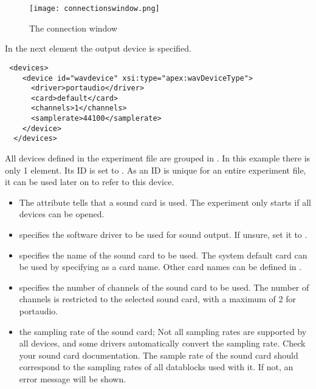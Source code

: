 \begin{figure}
 \centering
\texttt{[image: connectionswindow.png]}
 \caption{The connection window}
 \label{fig:ex1-output}
\end{figure}

In the next element the output device is specified.

\begin{lstlisting}
 <devices>
    <device id="wavdevice" xsi:type="apex:wavDeviceType">
      <driver>portaudio</driver>
      <card>default</card>
      <channels>1</channels>
      <samplerate>44100</samplerate>
    </device>
  </devices>

\end{lstlisting}

All devices defined in the experiment file are grouped in
. In this example there is only 1
 element. Its ID is set to . As an
ID is unique for an entire experiment file, it can be used later
on to refer to this device.

\begin{itemize}
\item  The  attribute tells
\apex that a sound card is used. The experiment only starts if all
devices can be opened.

\item {} specifies the software driver to be used
for sound output. If unsure, set it to .

\item {} specifies the name of the sound card to be
used. The system default card can be used by specifying
 as a card name. Other card names can be defined in
.

\item {} specifies the number of channels of the
sound card to be used. The number of channels is restricted to the
selected sound card, with a maximum of 2 for portaudio.

\item {} the sampling rate of the sound card;
Not all sampling rates are supported by all devices, and some
drivers automatically convert the sampling rate. Check your sound
card documentation. The sample rate of the sound card should
correspond to the sampling rates of all datablocks used with it.
If not, an error message will be shown.

\end{itemize}

